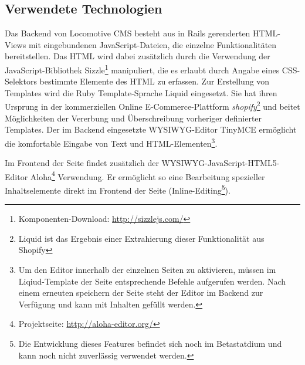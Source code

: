 \subsection{Verwendete Technologien}
\label{sec:TechnologienLocomotive}
Das Backend von Locomotive CMS besteht aus in Rails gerenderten HTML-Views mit eingebundenen JavaScript-Dateien, die einzelne Funktionalitäten bereitstellen. Das HTML wird dabei zusätzlich durch die Verwendung der JavaScript-Bibliothek Sizzle\footnote{Komponenten-Download: \href{http://sizzlejs.com/}{http://sizzlejs.com/}} manipuliert, die es erlaubt durch Angabe eines CSS-Selektors bestimmte Elemente des HTML zu erfassen.
Zur Erstellung von Templates wird die Ruby Template-Sprache Liquid eingesetzt. Sie hat ihren Ursprung in der kommerziellen Online E-Commerce-Plattform \emph{shopify}\footnote{Liquid ist das Ergebnis einer Extrahierung dieser Funktionalität aus Shopify} und beitet Möglichkeiten der Vererbung und Überschreibung vorheriger definierter Templates.
Der im Backend eingesetzte WYSIWYG-Editor TinyMCE ermöglicht die komfortable Eingabe von Text und HTML-Elementen\footnote{Um den Editor innerhalb der einzelnen Seiten zu aktivieren, müssen im Liqiud-Template der Seite entsprechende Befehle aufgerufen werden. Nach einem erneuten speichern der Seite steht der Editor im Backend zur Verfügung und kann mit Inhalten gefüllt werden.}.


Im Frontend der Seite findet zusätzlich der WYSIWYG-JavaScript-HTML5-Editor Aloha\footnote{Projektseite: \href{http://aloha-editor.org/}{http://aloha-editor.org/}} Verwendung. Er ermöglicht so eine Bearbeitung spezieller Inhaltselemente direkt im Frontend der Seite (Inline-Editing\footnote{Die Entwicklung dieses Features befindet sich noch im Betastatdium und kann noch nicht zuverlässig verwendet werden.}).

\newpage

